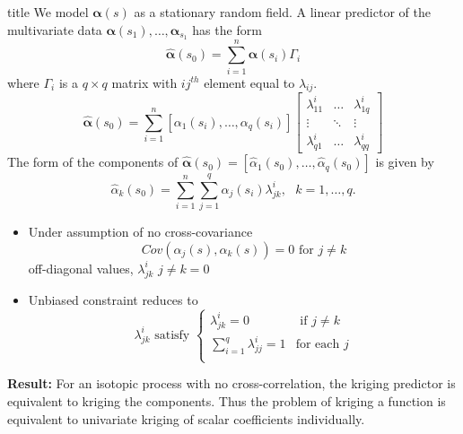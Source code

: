 \documentclass{beamer}
\newcommand{\balpha}{\boldsymbol\alpha}
\begin{document}
\begin{frame}[t]{title}
	We model $\balpha(s)$ as a stationary random field. A linear predictor of the multivariate data $\balpha(s_1), \dots, \balpha_{s_1}$ has the form
	\begin{equation*}
		\hat{\balpha}(s_0) = \sum_{i=1}^n \balpha(s_i)\Gamma_i \label{kriging:predictor}
	\end{equation*}
	where $\Gamma_i$ is a $q \times q$ matrix with $ij^{th}$ element equal to $\lambda_{ij}$. 
	\begin{equation*}
			\hat{\balpha}(s_0) = \sum_{i=1}^n [\alpha_1(s_i), \dots, \alpha_q(s_i)] 
			\left[ 
				\begin{array}{ccc}
					\lambda^i_{11} & \dots & \lambda^i_{1q}\\
					\vdots & \ddots & \vdots \\
					\lambda^i_{q1} & \dots & \lambda^i_{qq}
				\end{array}
			\right]
			\label{kriging:predictor 2}
	\end{equation*}
	The form of the components of $\hat{\balpha}(s_0)=[\hat{\alpha}_1(s_0), \dots, \hat{\alpha}_q(s_0)]$ is given by
	\begin{equation*}
		\hat{\alpha}_k(s_0) = \sum_{i=1}^n\sum_{j=1}^q\alpha_j(s_i)\lambda^i_{jk}, \mbox{ } k = 1, \dots, q.
	\end{equation*}
\end{frame}

\begin{frame}
	
	\begin{itemize}
		\item Under assumption of no cross-covariance
		\[
		Cov(\alpha_j(s), \alpha_k(s)) = 0 \mbox{ for } j \neq k
		\]
		off-diagonal values, $\lambda^i_{jk}$ $j \neq k = 0$
		\item Unbiased constraint reduces to 
		\begin{equation*}
			\lambda^i_{jk} \mbox{ satisfy } \begin{cases}
																\lambda^i_{jk} = 0 & \text{ if } j \neq k\\
																\sum_{i=1}^q \lambda^i_{jj} = 1 & \text{for each $j$}\\
		 										\end{cases}
		\end{equation*}
	\end{itemize}

	\textbf{Result:} For an isotopic process with no cross-correlation, the kriging predictor is equivalent to kriging the components. Thus the problem of kriging a function is equivalent to univariate kriging of scalar coefficients individually. 
	
\end{frame}
\end{document}
